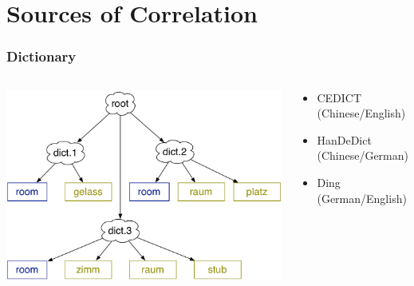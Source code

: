 {\begin{center}
\end{center}
}

\fi

\section{Sources of Correlation}

\frame
{
  \frametitle{Dictionary}

\begin{columns}

\begin{center}
\includegraphics[width=0.9\linewidth]{mlslda/dictionary}
\end{center}

\begin{block}{}
	\begin{itemize}
		\item CEDICT (Chinese/English) \cite{cedict}
		\item HanDeDict (Chinese/German) \cite{handedict}
		\item Ding (German/English) \cite{richter-08}
	\end{itemize}
\end{block}

\end{columns}

}

